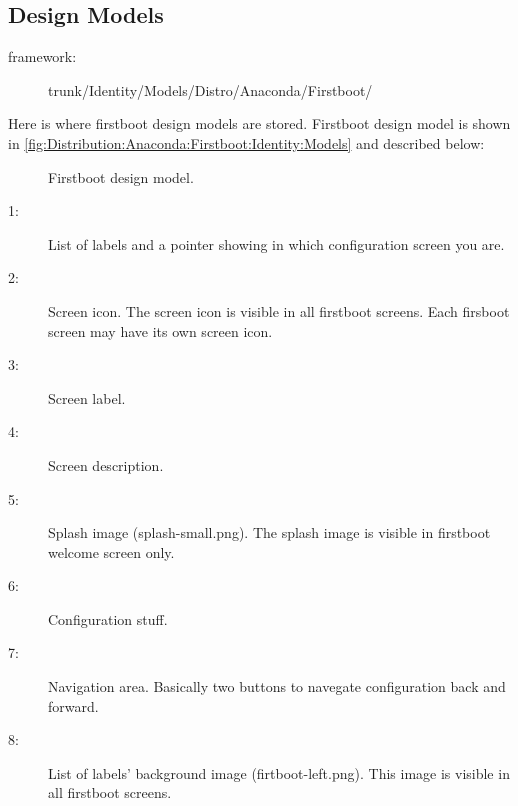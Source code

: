 \subsection{Design Models}

\begin{description}
\item[framework:]
trunk/Identity/Models/Distro/Anaconda/Firstboot/
\end{description}

\noindent Here is where firstboot design models are stored. Firstboot
design model is shown in
\autoref{fig:Distribution:Anaconda:Firstboot:Identity:Models} and described
below: 

\begin{figure}
\begin{center}
\end{center}
\caption{Firstboot design model.%
   \label{fig:Distribution:Anaconda:Firstboot:Identity:Models}}
\end{figure}

\begin{description}

\item[1:] List of labels and a pointer showing in which configuration
screen you are.

\item[2:] Screen icon. The screen icon is visible in all firstboot
screens. Each firsboot screen may have its own screen icon.

\item[3:] Screen label.

\item[4:] Screen description. 

\item[5:] Splash image (splash-small.png). The splash
image is visible in firstboot welcome screen only.

\item[6:] Configuration stuff.

\item[7:] Navigation area. Basically two buttons to navegate
configuration back and forward.

\item[8:] List of labels' background image (firtboot-left.png).  This
image is visible in all firstboot screens.

\end{description}

